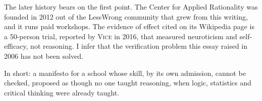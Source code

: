 \begin{afterword}
The later history bears on the first point. The Center for Applied Rationality was founded in 2012 out of the LessWrong community that grew from this writing, and it runs paid workshops. The evidence of effect cited on its Wikipedia page is a 50-person trial, reported by \textsc{Vice} in 2016, that measured neuroticism and self-efficacy, not reasoning. I infer that the verification problem this essay raised in 2006 has not been solved.

In short: a manifesto for a school whose skill, by its own admission, cannot be checked, proposed as though no one taught reasoning, when logic, statistics and critical thinking were already taught.
\end{afterword}
